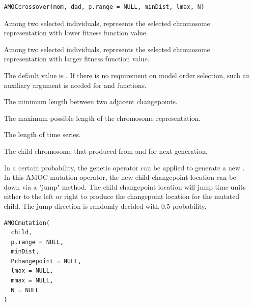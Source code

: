 \documentclass[a4paper]{book}
\begin{document}
%
\begin{Usage}
\begin{verbatim}
AMOCcrossover(mom, dad, p.range = NULL, minDist, lmax, N)
\end{verbatim}
\end{Usage}
%
\begin{Arguments}
\begin{ldescription}
\item[\code{mom}] Among two selected individuals,  represents the selected
chromosome representation with lower fitness function value.

\item[\code{dad}] Among two selected individuals,  represents the selected
chromosome representation with larger fitness function value.

\item[\code{p.range}] The default value is . If there is no requirement
on model order selection, such an auxiliary argument is needed for 
and  functions.

\item[\code{minDist}] The minimum length between two adjacent changepoints.

\item[\code{lmax}] The maximum possible length of the chromosome representation.

\item[\code{N}] The length of time series.
\end{ldescription}
\end{Arguments}
%
\begin{Value}
The child chromosome that produced from  and  for
next generation.
\end{Value}
%
\begin{Description}
In a certain probability, the  genetic operator can be applied
to generate a new . In this AMOC mutation operator, the new child
changepoint location can be down via a "jump" method. The child changepoint
location will jump  time units either to the left or right to
produce the changepoint location for the mutated child. The jump direction is
randomly decided with 0.5 probability.
\end{Description}
%
\begin{Usage}
\begin{verbatim}
AMOCmutation(
  child,
  p.range = NULL,
  minDist,
  Pchangepoint = NULL,
  lmax = NULL,
  mmax = NULL,
  N = NULL
)
\end{verbatim}
\end{Usage}
\end{document}

